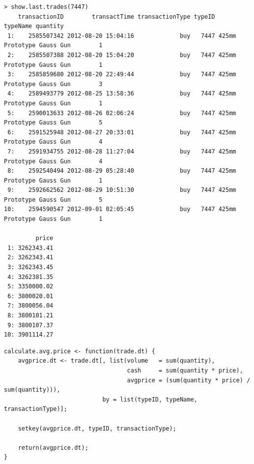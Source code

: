 \documentclass[12pt]{beamer}
\begin{document}
\begin{frame}[fragile]
\begin{verbatim}
> show.last.trades(7447)
    transactionID        transactTime transactionType typeID                  typeName quantity
 1:    2585507342 2012-08-20 15:04:16             buy   7447 425mm Prototype Gauss Gun        1
 2:    2585507388 2012-08-20 15:04:20             buy   7447 425mm Prototype Gauss Gun        1
 3:    2585859680 2012-08-20 22:49:44             buy   7447 425mm Prototype Gauss Gun        3
 4:    2589493779 2012-08-25 13:58:36             buy   7447 425mm Prototype Gauss Gun        1
 5:    2590013633 2012-08-26 02:06:24             buy   7447 425mm Prototype Gauss Gun        5
 6:    2591525948 2012-08-27 20:33:01             buy   7447 425mm Prototype Gauss Gun        4
 7:    2591934755 2012-08-28 11:27:04             buy   7447 425mm Prototype Gauss Gun        4
 8:    2592540494 2012-08-29 05:28:40             buy   7447 425mm Prototype Gauss Gun        1
 9:    2592662562 2012-08-29 10:51:30             buy   7447 425mm Prototype Gauss Gun        5
10:    2594590547 2012-09-01 02:05:45             buy   7447 425mm Prototype Gauss Gun        1

         price
 1: 3262343.41
 2: 3262343.41
 3: 3262343.45
 4: 3262381.35
 5: 3350000.02
 6: 3800020.01
 7: 3800056.04
 8: 3800101.21
 9: 3800107.37
10: 3901114.27
\end{verbatim}
\end{frame}


\begin{frame}[fragile]

\begin{verbatim}
calculate.avg.price <- function(trade.dt) {
    avgprice.dt <- trade.dt[, list(volume   = sum(quantity),
                                   cash     = sum(quantity * price),
                                   avgprice = (sum(quantity * price) / sum(quantity))),
                            by = list(typeID, typeName, transactionType)];

    setkey(avgprice.dt, typeID, transactionType);

    return(avgprice.dt);
}
\end{verbatim}
\end{frame}
\end{document}
